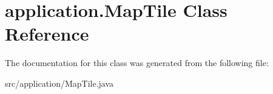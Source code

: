 \hypertarget{classapplication_1_1_map_tile}{\section{application.\+Map\+Tile Class Reference}
\label{classapplication_1_1_map_tile}
}


The documentation for this class was generated from the following file\+:\begin{DoxyCompactItemize}
\item 
src/application/Map\+Tile.\+java\end{DoxyCompactItemize}
